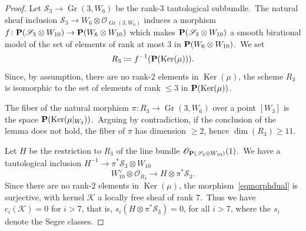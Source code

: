 \documentclass[12pt]{amsart}
\def\cO{\mathscr{O}}
\def\cS{\mathscr{S}}
\def\cK{\mathscr{K}}
\def\P{{\bf P}}
\DeclareMathOperator{\Gr}{Gr}
\DeclareMathOperator{\Ker}{Ker}
\def\lra{\longrightarrow}
\theoremstyle{remark}
\begin{document}
\begin{proof}
Let $\cS_3\to \Gr(3,W_6)$ be the rank-$3$ tautological subbundle.\
The natural sheaf inclusion $\cS_3\to  W_6\otimes \cO_{\Gr(3,W_6)}$ induces a morphism $f\colon \P(\cS_3\otimes W_{10})\to\P(W_6\otimes W_{10})$ which makes $\P(\cS_3\otimes W_{10})$ a smooth birational model of the set of elements of rank at most $ 3$ in $\P(W_6\otimes W_{10})$.\
We set
\[
R_3\coloneqq f^{-1}(\P(\Ker(\mu))).
\]
Since, by assumption, there are no rank-$2$ elements in $\Ker(\mu)$, the scheme $R_3$ is isomorphic to the set of elements of rank $\leq 3$ in $\P(\Ker(\mu))$.

The fiber of the natural morphism $\pi\colon R_3\to\Gr(3,W_6)$ over a point $[W_3]$ is the space $\P(\Ker(\mu\vert_{W_3}))$.\
Arguing by contradiction, if the conclusion of the lemma does not hold, the fiber of $\pi$ has dimension $\geq 2$, hence $\dim (R_3)\geq 11$.

Let $H$ be  the restriction to $R_3$ of the line bundle $\cO_{\P(\cS_3\otimes W_{10})}(1)$.\
We have a tautological inclusion $H^{-1}\to \pi^* \cS_3\otimes W_{10}$
\begin{equation}\label{eqmorphdual}
W_{10}^\vee\otimes \cO_{R_3}\lra  H\otimes \pi^*\cS_3.
\end{equation}
Since there are no rank-$2$ elements in $\Ker (\mu)$,  the morphism~\eqref{eqmorphdual}  is surjective, with kernel $\cK $ a locally free sheaf  of rank $7$.\
Thus we have $c_i(\cK)=0$ for $i>7$, that is, $s_i(H\otimes \pi^*\cS_3)=0$, for all $i>7$, where the $s_i$ denote the Segre classes.



\end{proof}
\end{document}
